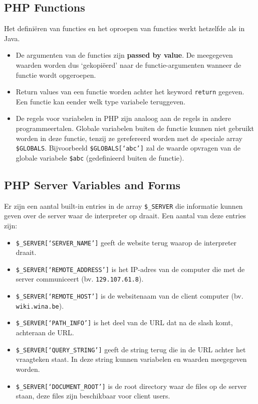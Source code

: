 \subsection{PHP Functions}
Het defini\"eren van functies en het oproepen van functies werkt hetzelfde als in Java.
\begin{itemize}
	\item De argumenten van de functies zijn \textbf{passed by value}. De meegegeven waarden worden dus `gekopi\"eerd' naar de functie-argumenten wanneer de functie wordt opgeroepen.
 
	\item Return values van een functie worden achter het keyword \texttt{return} gegeven. Een functie kan eender welk type variabele teruggeven.
 
	\item De regels voor variabelen in PHP zijn analoog aan de regels in andere programmeertalen. Globale variabelen buiten de functie kunnen niet gebruikt worden in deze functie, tenzij ze gerefereerd worden met de speciale array \texttt{\$GLOBALS}. Bijvoorbeeld \texttt{\$GLOBALS[`abc']} zal de waarde opvragen van de globale variabele \texttt{\$abc} (gedefinieerd buiten de functie).
\end{itemize}


\subsection{PHP Server Variables and Forms}
Er zijn een aantal built-in entries in de array \texttt{\$\_SERVER} die informatie kunnen geven over de server waar de interpreter op draait. Een aantal van deze entries zijn:
\begin{itemize}
	\item \texttt{\$\_SERVER[`SERVER\_NAME']} geeft de website terug waarop de interpreter draait.
	\item \texttt{\$\_SERVER[`REMOTE\_ADDRESS']} is het IP-adres van de computer die met de server communiceert (bv. \texttt{129.107.61.8}).
	\item \texttt{\$\_SERVER[`REMOTE\_HOST']} is de websitenaam van de client computer (bv. \texttt{wiki.wina.be}).
	\item \texttt{\$\_SERVER[`PATH\_INFO']} is het deel van de URL dat na de slash komt, achteraan de URL.
	\item \texttt{\$\_SERVER[`QUERY\_STRING']} geeft de string terug die in de URL achter het vraagteken staat. In deze string kunnen variabelen en waarden meegegeven worden.
	\item \texttt{\$\_SERVER[`DOCUMENT\_ROOT']} is de root directory waar de files op de server staan, deze files zijn beschikbaar voor client users.
\end{itemize}

